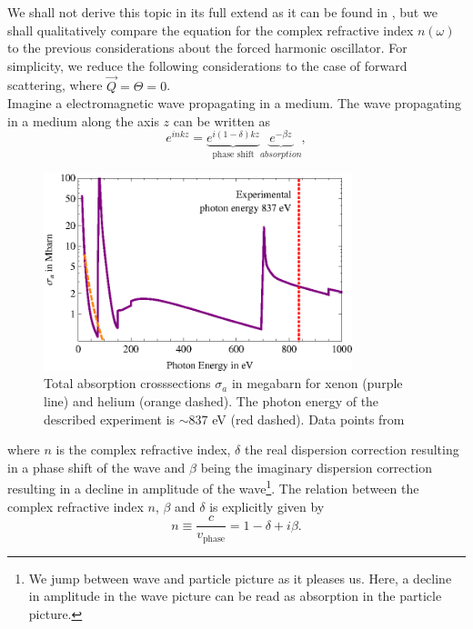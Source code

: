 We shall not derive this topic in its full extend as it can be found in \citep[][p. 55 ff]{Attwood-2007-CUP}, but we shall qualitatively compare the equation for the complex refractive index $n\left(\omega\right)$ to the previous considerations about the forced harmonic oscillator. For simplicity, we reduce the following considerations to the case of forward scattering, where $\vec{Q}=\Theta=0$.\\
Imagine a electromagnetic wave propagating in a medium. The wave propagating in a medium along the axis $z$ can be written as
\begin{equation}
e^{i n k z}= \underbrace{e^{i \left(1-\delta\right)k z}}_{\text{phase shift}}\underbrace{e^{-\beta z}}_{absorption},
\label{eq:wave-in-medium}
\end{equation}
\begin{figure}
	\centering
		\includegraphics[width=0.80\textwidth]{images/photoionization.eps}
	\caption[Total absorption cross-sections for helium and xenon.]{Total absorption crosssections $\sigma_{a}$ in megabarn for xenon (purple line) and helium (orange dashed). The photon energy of the described experiment is $\sim 837$ eV (red dashed). Data points from \citep{Elettra-2016-Website,Yeh-1985-AtmDat,Yeh-1993-GBSP}}
	\label{fig:photoionization}
\end{figure}
where $n$ is the complex refractive index, $\delta$ the real dispersion correction resulting in a phase shift of the wave and $\beta$ being the imaginary dispersion correction resulting in a decline in amplitude of the wave\footnote{We jump between wave and particle picture as it pleases us. Here, a decline in amplitude in the wave picture can be read as absorption in the particle picture.}. The relation between the complex refractive index $n$, $\beta$ and $\delta$ is explicitly given by
\begin{equation}
n\equiv \frac{c}{v_{\text{phase}}}=1-\delta+i\beta.
\label{eq:complex-refractive-index}
\end{equation}
